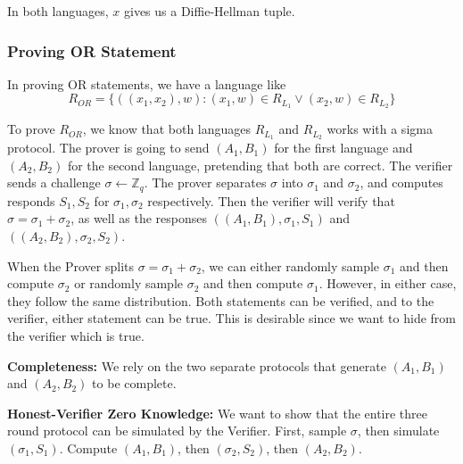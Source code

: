 In both languages, $x$ gives us a Diffie-Hellman tuple.

\subsubsection{Proving OR Statement}

In proving OR statements, we have a language like
\[ R_{OR} = \{ ((x_1, x_2), w): (x_1, w) \in R_{L_1} \vee (x_2, w) \in R_{L_2} \} \]

To prove $R_{OR}$, we know that both languages $R_{L_1}$ and $R_{L_2}$ works with a sigma protocol. The prover is going to send $(A_1, B_1)$ for the first language and $(A_2, B_2)$ for the second language, pretending that both are correct. The verifier sends a challenge $\sigma \gets \mathbb{Z}_q$. The prover separates $\sigma$ into $\sigma_1$ and $\sigma_2$, and computes responds $S_1, S_2$ for $\sigma_1, \sigma_2$ respectively. Then the verifier will verify that $\sigma = \sigma_1 + \sigma_2$, as well as the responses $((A_1, B_1), \sigma_1, S_1)$ and $((A_2, B_2), \sigma_2, S_2)$.


When the Prover splits $\sigma = \sigma_1 + \sigma_2$, we can either randomly sample $\sigma_1$ and then compute $\sigma_2$ or randomly sample $\sigma_2$ and then compute $\sigma_1$. However, in either case, they follow the same distribution. Both statements can be verified, and to the verifier, either statement can be true. This is desirable since we want to hide from the verifier which is true.

\textbf{Completeness:} We rely on the two separate protocols that generate $(A_1, B_1)$ and $(A_2, B_2)$ to be complete.

\textbf{Honest-Verifier Zero Knowledge:} We want to show that the entire three round protocol can be simulated by the Verifier. First, sample $\sigma$, then simulate $(\sigma_1, S_1)$. Compute $(A_1, B_1)$, then $(\sigma_2, S_2)$, then $(A_2, B_2)$.

